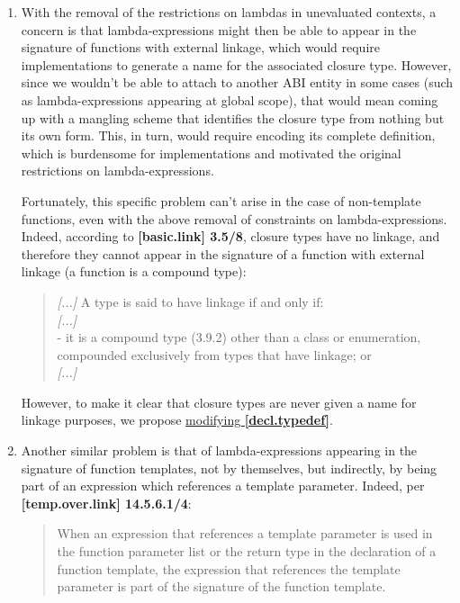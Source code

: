 \documentclass{wg21}
\begin{document}
\begin{enumerate}
  \item \label{discussion.non-template}
    With the removal of the restrictions on lambdas in unevaluated contexts,
    a concern is that lambda-expressions might then be able to appear in the
    signature of functions with external linkage, which would require implementations
    to generate a name for the associated closure type. However, since we wouldn't
    be able to attach to another ABI entity in some cases (such as lambda-expressions
    appearing at global scope), that would mean coming up with a mangling scheme
    that identifies the closure type from nothing but its own form. This, in turn,
    would require encoding its complete definition, which is burdensome for
    implementations and motivated the original restrictions on lambda-expressions.

    Fortunately, this specific problem can't arise in the case of non-template
    functions, even with the above removal of constraints on lambda-expressions.
    Indeed, according to \textbf{[basic.link] 3.5/8}, closure types have no linkage,
    and therefore they cannot appear in the signature of a function with external
    linkage (a function is a compound type):
    \begin{quote}
      \textit{[...]} A type is said to have linkage if and only if:\\
      \textit{[...]}\\
      - it is a compound type (3.9.2) other than a class or enumeration,
        compounded exclusively from types that have linkage; or \\
      \textit{[...]}
    \end{quote}

    However, to make it clear that closure types are never given a name for
    linkage purposes, we propose \hyperref[wording.non-template]{modifying
    \textbf{[decl.typedef]}}.


  \item \label{discussion.template}
    Another similar problem is that of lambda-expressions appearing in the
    signature of function templates, not by themselves, but indirectly, by being
    part of an expression which references a template parameter. Indeed, per
    \textbf{[temp.over.link] 14.5.6.1/4}:
    \begin{quote}
      When an expression that references a template parameter is used in the
      function parameter list or the return type in the declaration of a function
      template, the expression that references the template parameter is part of
      the signature of the function template.
    \end{quote}


\end{enumerate}
\end{document}
